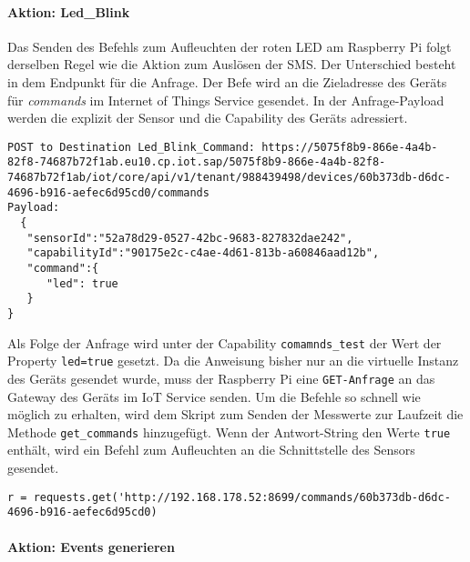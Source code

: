 \paragraph{Aktion: Led\_Blink}

Das Senden des Befehls zum Aufleuchten der roten LED am Raspberry Pi folgt derselben Regel wie die Aktion zum Auslösen der SMS. Der Unterschied besteht in dem Endpunkt für die Anfrage. Der Befe wird an die Zieladresse des Geräts für \textit{commands} im Internet of Things Service gesendet. In der Anfrage-Payload werden die explizit der Sensor und die Capability des Geräts adressiert. 
\newline
\begin{lstlisting}[caption= POST-Anfrage zum Senden den Befehls]
POST to Destination Led_Blink_Command: https://5075f8b9-866e-4a4b-82f8-74687b72f1ab.eu10.cp.iot.sap/5075f8b9-866e-4a4b-82f8-74687b72f1ab/iot/core/api/v1/tenant/988439498/devices/60b373db-d6dc-4696-b916-aefec6d95cd0/commands
Payload:
  {
   "sensorId":"52a78d29-0527-42bc-9683-827832dae242",
   "capabilityId":"90175e2c-c4ae-4d61-813b-a60846aad12b",
   "command":{
      "led": true
   }
}
\end{lstlisting}

\noindent Als Folge der Anfrage wird unter der Capability \texttt{comamnds\_test} der Wert der Property \texttt{led=true} gesetzt. Da die Anweisung bisher nur an die virtuelle Instanz des Geräts gesendet wurde, muss der Raspberry Pi eine \texttt{GET-Anfrage} an das Gateway des Geräts im IoT Service senden. Um die Befehle so schnell wie möglich zu erhalten, wird dem Skript zum Senden der Messwerte zur Laufzeit die Methode \texttt{get\_commands} hinzugefügt. Wenn der Antwort-String den Werte \texttt{true} enthält, wird ein Befehl zum Aufleuchten an die Schnittstelle des Sensors gesendet.  
\newline
\begin{lstlisting}[caption= GET-Anfrage für Commands an das Gateway ]
  r = requests.get('http://192.168.178.52:8699/commands/60b373db-d6dc-4696-b916-aefec6d95cd0)
\end{lstlisting}

\paragraph{Aktion: Events generieren}


